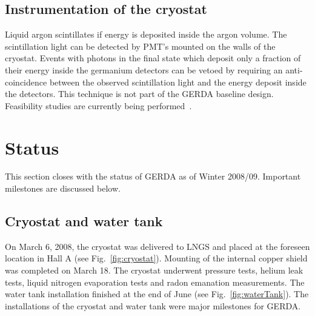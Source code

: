 \subsection{Instrumentation of the cryostat}
\label{sec:gerda:scint}
Liquid argon scintillates if energy is deposited inside the argon volume. The scintillation light can be detected by PMT's mounted on the walls of the cryostat.  Events with photons in the final state which deposit only a fraction of their energy inside the germanium detectors can be vetoed by requiring an anti-coincidence between the observed scintillation light and the energy deposit inside the detectors.  This technique is not part of the GERDA baseline design. Feasibility studies are currently being performed~\cite{Pei05, Orr06}.

\section{Status}
\label{sec:gerda:stat}
This section closes with the status of GERDA as of Winter 2008/09. Important milestones are discussed below.  

\subsection{Cryostat and water tank}
\label{sec:gerda:stat1}
On March 6, 2008, the cryostat was delivered to LNGS and placed at the foreseen location in Hall A (see Fig.~\ref{fig:cryostat}). Mounting of the internal copper shield was completed on March 18. The cryostat underwent pressure tests, helium leak tests, liquid nitrogen evaporation tests and radon emanation measurements. The water tank installation finished at the end of June (see Fig.~\ref{fig:waterTank}). The installations of the cryostat and water tank were major milestones for GERDA.

